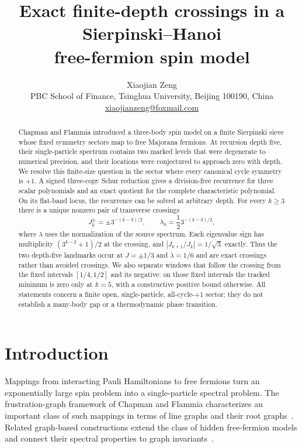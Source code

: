 \documentclass[11pt]{article}
\title{Exact finite-depth crossings in a Sierpinski--Hanoi\\
free-fermion spin model}
\author{Xiaojian Zeng\\
\small PBC School of Finance, Tsinghua University, Beijing 100190, China\\
\small \href{mailto:xiaojianzeng@foxmail.com}{xiaojianzeng@foxmail.com}}
\date{}
\theoremstyle{remark}
\begin{document}
\maketitle

\begin{abstract}
Chapman and Flammia introduced a three-body spin model on a finite
Sierpinski sieve whose fixed symmetry sectors map to free Majorana fermions.
At recursion depth five, their single-particle spectrum contains two marked
levels that were degenerate to numerical precision, and their locations were
conjectured to approach zero with depth.  We resolve this finite-size question
in the sector where every canonical cycle symmetry is $+1$.  A signed
three-copy Schur reduction gives a division-free recurrence for three scalar
polynomials and an exact quotient for the complete characteristic polynomial.
On its flat-band locus, the recurrence can be solved at arbitrary depth.  For
every $k\geq3$ there is a unique nonzero pair of transverse crossings
\[
 J_k^\pm=\pm3^{-(k-3)/2},\qquad
 \lambda_k=\frac12 3^{-(k-3)/2},
\]
where $\lambda$ uses the normalization of the source spectrum.  Each
eigenvalue sign has multiplicity $(3^{k-2}+1)/2$ at the crossing, and
$|J_{k+1}/J_k|=1/\sqrt3$ exactly.  Thus the two depth-five landmarks occur at
$J=\pm1/3$ and $\lambda=1/6$ and are exact crossings rather than avoided
crossings.  We also separate windows that follow the crossing from the fixed
intervals $[1/4,1/2]$ and its negative: on those fixed intervals the tracked
minimum is zero only at $k=5$, with a constructive positive bound otherwise.
All statements concern a finite open, single-particle, all-cycle-$+1$ sector;
they do not establish a many-body gap or a thermodynamic phase transition.
\end{abstract}

\section{Introduction}

Mappings from interacting Pauli Hamiltonians to free fermions turn an
exponentially large spin problem into a single-particle spectral problem.
The frustration-graph framework of Chapman and Flammia characterizes an
important class of such mappings in terms of line graphs and their root
graphs~\cite{ChapmanFlammia2020}.  Related graph-based constructions extend
the class of hidden free-fermion models and connect their spectral properties
to graph invariants~\cite{ElmanChapmanFlammia2021,ChapmanFlammiaKollar2022}.
\end{document}
